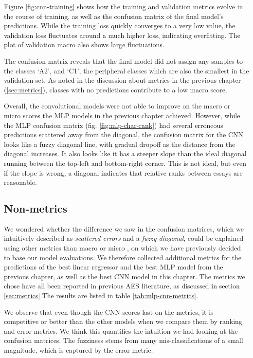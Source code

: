 Figure \ref{fig:cnn-training} shows how the training and validation metrics
evolve in the course of training, as well as the confusion matrix of the
final model's predictions. While the training loss quickly converges to a
very low value, the validation loss fluctuates around a much higher loss,
indicating overfitting. The plot of validation macro \FI also shows large
fluctuations.

The confusion matrix reveals that the final model did not assign any samples
to the classes `A2', and `C1', the peripheral classes which are also the
smallest in the validation set. As noted in the discussion about metrics in
the previous chapter (\ref{sec:metrics}), classes with no predictions
contribute to a low macro \FI score.

Overall, the convolutional models were not able to improve on the macro or
micro \FI scores the \ac{MLP} models in the previous chapter achieved.
However, while the \ac{MLP} confusion matrix (fig. \ref{fig:mlp-char-rank})
had several erroneous predictions scattered away from the diagonal, the
confusion matrix for the \ac{CNN} looks like a fuzzy diagonal line, with
gradual dropoff as the distance from the diagonal increases. It also looks
like it has a steeper slope than the ideal diagonal running between the
top-left and bottom-right corner. This is not ideal, but even if the slope
is wrong, a diagonal indicates that relative ranks between essays are
reasonable.


\subsection{Non-\FI metrics}

We wondered whether the difference we saw in the confusion matrices, which we
intuitively described as \emph{scattered errors} and a \emph{fuzzy diagonal},
could be explained using other metrics than macro or micro \FI, on which we
have previously decided to base our model evaluations. We therefore collected
additional metrics for the predictions of the best linear regressor and the
best MLP model from the previous chapter, as well as the best CNN model in
this chapter. The metrics we chose have all been reported in previous
\ac{AES} literature, as discussed in section \ref{sec:metrics} The results
are listed in table \ref{tab:mlp-cnn-metrics}.

We observe that even though the \ac{CNN} scores last on the \FI metrics, it
is competitive or better than the other models when we compare them by
ranking and error metrics. We think this quantifies the intuition we had
looking at the confusion matrices. The fuzziness stems from many
mis-classifications of a small magnitude, which is captured by the error
metric.

